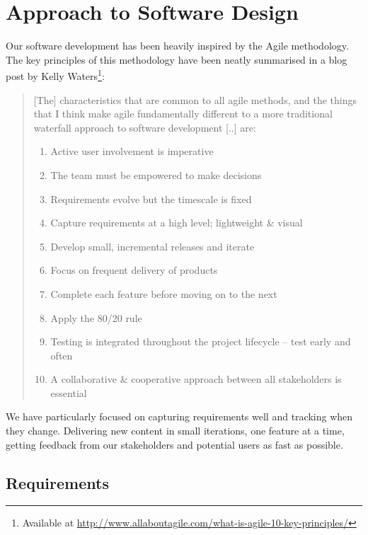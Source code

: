 \section{Approach to Software Design}
\label{sec:design_considerations}

Our software development has been heavily inspired by the Agile methodology. 
The key principles of this methodology have been neatly summarised in a blog post by Kelly Waters\footnote{Available at \url{http://www.allaboutagile.com/what-is-agile-10-key-principles/}}:

\blockquote{
    [The] characteristics that are common to all agile methods, and the things that I think make agile fundamentally different to a more traditional waterfall approach to software development [..] are:
    
    \begin{enumerate}
        \item Active user involvement is imperative 
        \item The team must be empowered to make decisions 
        \item Requirements evolve but the timescale is fixed 
        \item Capture requirements at a high level; lightweight \& visual 
        \item Develop small, incremental releases and iterate 
        \item Focus on frequent delivery of products 
        \item Complete each feature before moving on to the next 
        \item Apply the 80/20 rule 
        \item Testing is integrated throughout the project lifecycle – test early and often 
        \item A collaborative \& cooperative approach between all stakeholders is essential 
    \end{enumerate}
}

We have particularly focused on capturing requirements well and tracking when they change. 
Delivering new content in small iterations, one feature at a time, getting feedback from our stakeholders and potential users as fast as possible.

\subsection{Requirements}


